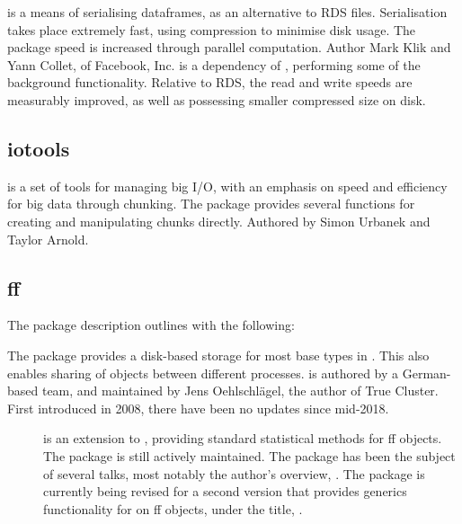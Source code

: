  is a means of serialising dataframes, as an alternative to RDS
files\cite{klik2022fst}.
Serialisation takes place extremely fast, using compression to minimise disk usage.
The package speed is increased through parallel computation.
Author Mark Klik and Yann Collet, of Facebook, Inc.
 is a dependency of , performing some of the
background functionality.
Relative to RDS, the read and write speeds are measurably improved, as well as possessing smaller compressed size on disk.

\subsection{iotools}\label{subsec:iotools}

 is a set of tools for managing big I/O, with an emphasis on
speed and efficiency for big data through chunking\cite{urbanek20b}.
The package provides several functions for creating and manipulating chunks directly.
Authored by Simon Urbanek and Taylor Arnold.

\subsection{ff}\label{subsec:ff}

The package description outlines  with the following:


The package provides a disk-based storage for most base types in \R{}.
This also enables sharing of objects between different \R{} processes.
 is
authored by a German-based team, and maintained by Jens Oehlschlägel,
the author of True Cluster.
First introduced in 2008\cite{adler08:_large_r}, there have been no updates since mid-2018.

\begin{description}
	\item[\cite{jonge20}]
		is an extension to , providing standard statistical methods for ff
		objects.
		The package is still actively maintained.
		The package has been the subject of several talks, most notably the author's overview, \cite{wijffels13}.
		The package is currently being revised for a second version that provides generics functionality for  on ff objects, under the title, \cite{jonge15}.
\end{description}
